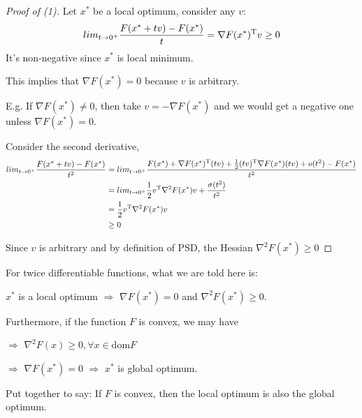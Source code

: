 \begin{proof}[Proof of (1)]
	Let $x^*$ be a local optimum, consider any $v$:
	\begin{equation*}
	lim_{t\rightarrow 0^+}\frac{F(x^* + tv) - F(x^*)}{t} = \nabla F(x^*)^{{\rm T}}v\geq 0
	\end{equation*}
	It's non-negative since $x^*$ is local minimum.
	
	This implies that $\nabla F(x^*) = 0$ because $v$ is arbitrary. 
	
	E.g. If $\nabla F(x^*) \neq 0$, then take $v = -\nabla F(x^*)$ and we would get a negative one unless $\nabla F(x^*) = 0.$
	
Consider the second derivative,
\begin{align*}
lim_{t\rightarrow 0^+}\frac{F(x^* + tv) - F(x^*)}{t^2} &= lim_{t\rightarrow 0^+} \frac{F(x^*) + \nabla F(x^*)^{{\rm T}}(tv) + \frac{1}{2}(tv)^{{\rm T}}\nabla F(x^*)(tv) + o(t^2) - F(x^*)}{t^2}\\
&= lim_{t\rightarrow 0^+} \frac{1}{2}v^{{\rm T}}\nabla^2F(x^*)v+\frac{\sigma(t^2)}{t^2}\\
&= \frac{1}{2}v^{{\rm T}}\nabla^2F(x^*)v \\
&\geq 0
\end{align*}

Since $v$ is arbitrary and by definition of PSD, the Hessian $\nabla^2 F(x^*) \geq 0$

\end{proof}

For twice differentiable functions, what we are told here is: 

$x^*$ is a local optimum $\Rightarrow$ $\nabla F(x^*) = 0$ and $\nabla^2F(x^*)\geq 0$.

Furthermore, if the function $F$ is convex, we may have

$\Rightarrow$ $\nabla^2F(x)\geq0, \forall x\in \text{dom}F$

$\Rightarrow$ $\nabla F(x^*) = 0$ $\Rightarrow$ $x^*$ is global optimum.

Put together to say: If $F$ is convex, then the local optimum is also the global optimum.\\

\vspace{0.3cm}

